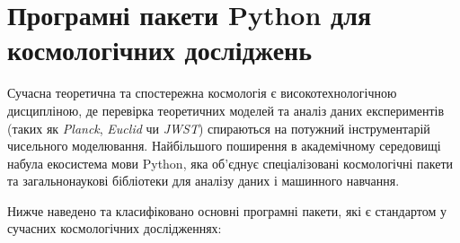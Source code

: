 
\chapter{Програмні пакети Python для космологічних досліджень}
\label{sec:python_packages}

Сучасна теоретична та спостережна космологія є високотехнологічною дисципліною, де перевірка теоретичних моделей та аналіз даних експериментів (таких як \emph{Planck}, \emph{Euclid} чи \emph{JWST}) спираються на потужний інструментарій чисельного моделювання. Найбільшого поширення в академічному середовищі набула екосистема мови Python, яка об'єднує спеціалізовані космологічні пакети та загальнонаукові бібліотеки для аналізу даних і машинного навчання.

Нижче наведено та класифіковано основні програмні пакети, які є стандартом у сучасних космологічних дослідженнях:

